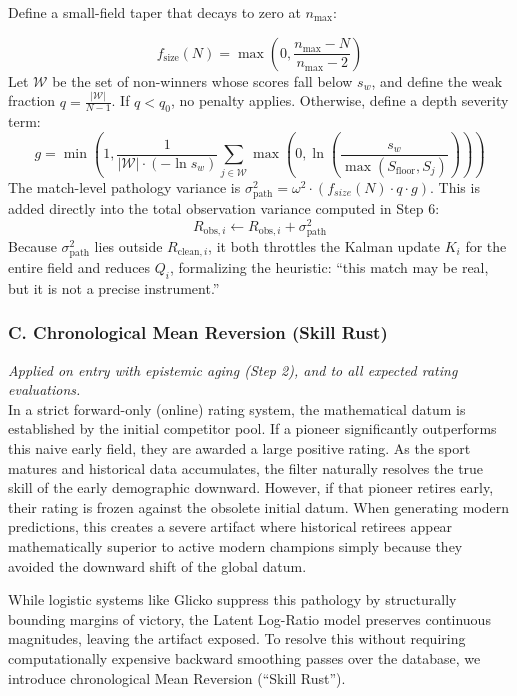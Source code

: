 \documentclass[12pt]{article}
\begin{document}
	Define a small-field taper that decays to zero at $n_{\mathrm{max}}$:

	\begin{equation}
		f_{\mathrm{size}}(N) = \max\!\left(0,\frac{n_{\mathrm{max}} - N}{n_{\mathrm{max}} - 2}\right)
	\end{equation}
	Let $\mathcal{W}$ be the set of non-winners whose scores fall below $s_w$, and define the weak fraction $q = \frac{|\mathcal{W}|}{N - 1}$. If $q < q_0$, no penalty applies. Otherwise, define a depth severity term:
	\begin{equation}
		g = \min\!\left(1,\frac{1}{|\mathcal{W}| \cdot (-\ln s_w)} \sum_{j \in \mathcal{W}} \max\!\left(0,\ln\!\left(\frac{s_w}{\max(S_{\mathrm{floor}}, S_j)}\right)\right)\right)
	\end{equation}
	The match-level pathology variance is $\sigma_{\mathrm{path}}^2 = \omega^2 \cdot (f_{size}(N) \cdot q \cdot g)$. This is added directly into the total observation variance computed in Step 6:
	\begin{equation}
		R_{\mathrm{obs},i} \leftarrow R_{\mathrm{obs},i} + \sigma_{\mathrm{path}}^2
	\end{equation}
	Because $\sigma_{\mathrm{path}}^2$ lies outside $R_{\mathrm{clean},i}$, it both throttles the Kalman update $K_i$ for the entire field and reduces $Q_i$, formalizing the heuristic: ``this match may be real, but it is not a precise instrument.''

	\subsubsection*{C. Chronological Mean Reversion (Skill Rust)}
	\emph{Applied on entry with epistemic aging (Step 2), and to all expected rating evaluations.}\\
	In a strict forward-only (online) rating system, the mathematical datum is established by the initial competitor pool. If a pioneer significantly outperforms this naive early field, they are awarded a large positive rating. As the sport matures and historical data accumulates, the filter naturally resolves the true skill of the early demographic downward. However, if that pioneer retires early, their rating is frozen against the obsolete initial datum. When generating modern predictions, this creates a severe artifact where historical retirees appear mathematically superior to active modern champions simply because they avoided the downward shift of the global datum.

	While logistic systems like Glicko suppress this pathology by structurally bounding margins of victory, the Latent Log-Ratio model preserves continuous magnitudes, leaving the artifact exposed. To resolve this without requiring computationally expensive backward smoothing passes over the database, we introduce chronological Mean Reversion (``Skill Rust'').
\end{document}
